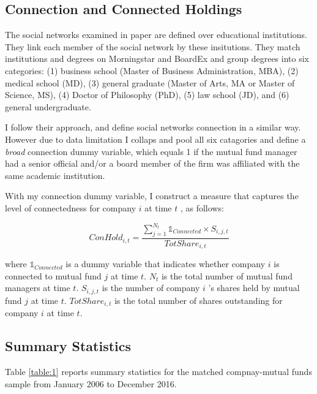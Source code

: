 \documentclass[11pt]{article}
\begin{document}
\begin{doublespace}
\subsection{Connection and Connected Holdings}
The social networks examined in \cite{cohen2008small} paper are defined over educational institutions. They link each member of the social network by these insitutions. They match institutions and degrees on Morningstar and BoardEx and group degrees into six categories: (1) business school (Master of Business Administration, MBA), (2) medical school (MD), (3) general graduate (Master of Arts, MA or Master of Science, MS), (4) Doctor of Philosophy (PhD), (5) law school (JD), and (6) general undergraduate. 

I follow their approach, and define social networks connection in a similar way. However due to data limitation I collaps and pool all six catagories and define a \emph{broad} connection dummy variable, which equals 1 if the mutual fund manager had a senior official and/or a board member of the firm was affiliated with the same academic institution. 

With my connection dummy variable, I construct a measure that captures the level of connectedness for company $i$ at time $t$ , as follows:

\begin{equation}
 ConHold_{i,t} = \frac{\sum_{j=1}^{N_t}\mathbb{1}_{Connected} \times S_{i,j,t}} {TotShare_{i,t}}
\label{eq:eq1}
\end{equation}

where $\mathbb{1}_{Connected}$ is a dummy variable that indicates whether company $i$ is connected to mutual fund $j$ at time $t$. $N_t$ is the total number of mutual fund managers at time $t$.  $S_{i,j,t}$ is the number of company $i$ 's shares held by mutual fund $j$ at time $t$. $TotShare_{i,t}$ is the total number of shares outstanding for company $i$ at time $t$. 

\subsection{Summary Statistics}
Table \ref{table:1} reports summary statistics for the matched compnay-mutual funds sample from January 2006 to December 2016.  


\end{doublespace}
\end{document}
